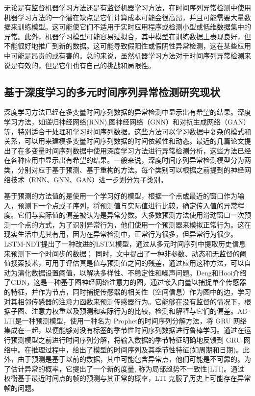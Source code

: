 无论是有监督机器学习方法还是有监督机器学习方法，在时间序列异常检测中使用机器学习方法的一个潜在缺点是它们计算成本可能会很高昂，并且可能需要大量数据来训练模型。这可能使它们不适用于实时应用程序或检测小型或低维数据集中的异常。此外，机器学习模型可能容易过拟合，其中模型在训练数据上表现良好，但不能很好地推广到新的数据。这可能导致假阳性或假阴性异常检测，这在某些应用中可能是昂贵的或有害的。总的来说，虽然机器学习方法对于时间序列异常检测来说是有效的，但是它们也有自己的挑战和局限性。


\subsection{基于深度学习的多元时间序列异常检测研究现状}

深度学习方法已经在多变量时间序列数据的异常检测中显示出有希望的结果。深度学习方法，如递归神经网络(RNN)\cite{RNN, lstm, gru},图神经网络（GNN）\cite{GNN}和对抗生成网络（GAN）\cite{gan}等，特别适合于处理和学习时间序列数据。这些方法可以学习数据中复杂的模式和关系，可以用来建模多变量时间序列数据的时间依赖性和动态。最近的几篇论文\cite{green18, green10, green11, green12}提出了在多变量时间序列数据中使用深度学习方法进行异常检测分析，这些方法已经在各种应用中显示出有希望的结果。一般来说，深度时间序列异常检测模型分为两类，分别对应于基于预测、基于重构的方法。每个类别可以根据之前提到的神经网络技术（RNN、GNN、GAN）进一步划分为子类别。

基于预测的方法值的是使用一个学习好的模型，根据一个点或最近的窗口作为输入，预测下一个点或子序列，将预测值与实际值进行比较，确定传入值的异常程度。它们与实际值的偏差被认为是异常分数。大多数预测方法使用滑动窗口一次预测一个点的方式，为了识别异常行为，他们使用一个预测器来模拟正常行为。这在现实生活中尤其有用，因为在异常检测中，正常行为很多，但异常行为很少。LSTM-NDT\cite{lstm-ndt}提出了一种改进的LSTM模型，通过从多元时间序列中提取历史信息来预测下一个时间步的数据； 同时，文中提出了一种非参数、动态和无监督的阈值搜索技术，可用于评估真是值与预测值之间的残差，通过应用这种方法，可以自动为演化数据设置阈值，以解决多样性、不稳定性和噪声问题。Deng和Hooi\cite{gdn}介绍了GDN，这是一种基于图神经网络注意力的图，通过嵌入向量以捕捉单个传感器的特征，并作为节点，同时捕捉传感器的相关性（空间信息）作为图中的边，学习对其相邻传感器的注意力函数来预测传感器行为。它能够在没有监督的情况下，根据子图、注意力权重以及预测和实际行为的比较，检测和解释与它们的偏差。AD-LTI\cite{ad-lti}是一种预测模型，使用一种名为 Prophet的时间序列分解方法，将 GRU 网络集成在一起，以便能够对没有标签的季节性时间序列数据进行鲁棒学习。通过在运行预测模型之前进行时间序列分解，将输入数据的季节特征明确地反馈到 GRU 网络中。在推理过程中，给出了模型的时间序列及其季节性特征(如周期和日期)。此外，由于预测是基于以前的数据，其中可能包含异常点，他们可能是不可靠的。为了估计异常的概率，它提出了一个新的度量, 称为局部趋势不一致性(LTI)。通过权衡基于最近时间点的帧的预测与其正常的概率，LTI 克服了历史上可能存在异常帧的问题。

